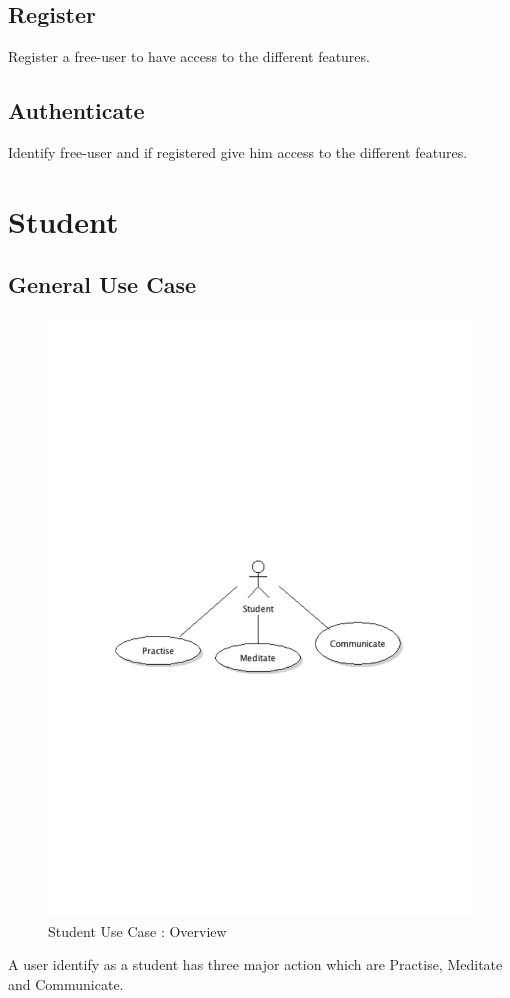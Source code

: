 	\subsection{Register}Register a free-user to have access to the different features.
	\subsection{Authenticate}Identify free-user and if registered give him access to the different features.
\newpage
\section{Student}
	\subsection{General Use Case}
		\begin{figure}[ht]
			\begin{center}
				\includegraphics[width=\textwidth,  trim=2cm 10cm 2cm 11cm]{UML_figure/UC/student/UC_Student_General.pdf}
				\caption{Student Use Case : Overview}
			\end{center}
		\end{figure}
		A user identify as a student has three major action which are Practise, Meditate and Communicate.
